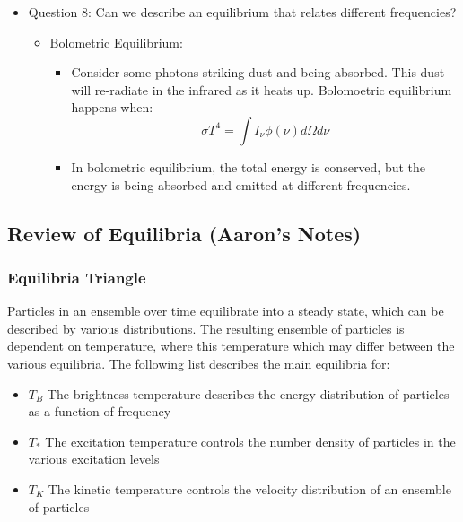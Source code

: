 \documentclass{article}
\begin{document}
\begin{itemize}
\begin{itemize}
    \end{itemize}
    \item Question 8: Can we describe an equilibrium that relates different frequencies?
    \begin{itemize}
        \item Bolometric Equilibrium:
        \begin{itemize}
            \item Consider some photons striking dust and being absorbed. This dust will re-radiate in the infrared as it heats up. Bolomoetric equilibrium happens when:
            \begin{equation}
                \sigma T^4 = \int I_\nu \phi(\nu) d\Omega d\nu
            \end{equation}
            \item In bolometric equilibrium, the total energy is conserved, but the energy is being absorbed and emitted at different frequencies. 
        \end{itemize}
    \end{itemize}
\end{itemize}

\subsection{Review of Equilibria (Aaron's Notes)}

\subsubsection{Equilibria Triangle}
Particles in an ensemble over time equilibrate into a steady state, which can be described by various distributions. The resulting ensemble of particles is dependent on temperature, where this temperature which may differ between the various equilibria. The following list describes the main equilibria for: 

\begin{itemize} 
\item $T_B$ The brightness temperature describes the energy distribution of particles as a function of frequency 
\item $T_*$ The excitation temperature controls the number density of particles in the various excitation levels 
\item $T_K$ The kinetic temperature controls the velocity distribution of an ensemble of particles 
\end{itemize} 
\end{document}
